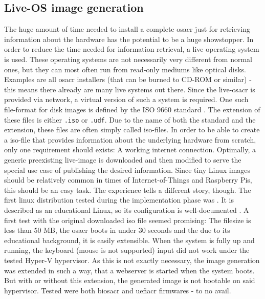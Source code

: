 \subsection{Live-OS image generation}
The huge amount of time needed to install a complete \gls{osacr} just for retrieving information about the hardware has the potential to be a huge showstopper. In order to reduce the time needed for information retrieval, a live operating system is used. These operating systems are not necessarily very different from normal ones, but they can most often run from read-only mediums like optical disks. Examples are all \gls{osacr} installers (that can be burned to CD-ROM or similar) - this means there already are many live systems out there.
\newline
Since the live-\gls{osacr} is provided via network, a virtual version of such a system is required. One such file-format for disk images is defined by the ISO 9660 standard \cite{iso9660_spec}. The extension of these files is either \texttt{.iso} or \texttt{.udf}. Due to the name of both the standard and the extension, these files are often simply called iso-files.
\newline
In order to be able to create a iso-file that provides information about the underlying hardware from scratch, only one requirement should exists: A working internet connection. Optimally, a generic preexisting live-image is downloaded and then modified to serve the special use case of publishing the desired information. Since tiny Linux images should be relatively common in times of Internet-of-Things and Raspberry Pis, this should be an easy task. The experience tells a different story, though.
\newline
The first linux distribution tested during the implementation phase was . It is described as an educational Linux, so its configuration is well-documented \cite{mll}. A first test with the original downloaded iso file seemed promising: The filesize is less than 50 MB, the \gls{osacr} boots in under 30 seconds and the due to its educational background, it is easily extensible. When the system is fully up and running, the keyboard (mouse is not supported) input did not work under the tested Hyper-V hypervisor. As this is not exactly necessary, the image generation was extended in such a way, that a webserver is started when the system boots. But with or without this extension, the generated image is not bootable on said hypervisor. Tested were both \gls{biosacr} and \gls{uefiacr} firmwares - to no avail.

